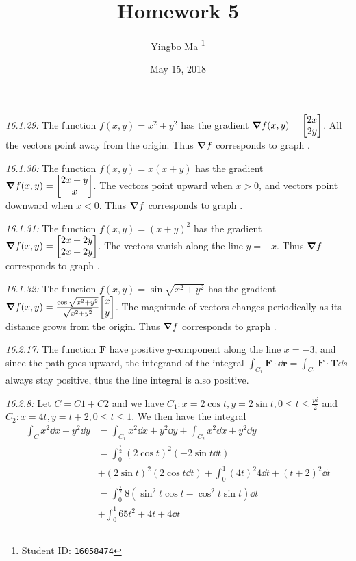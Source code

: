 \documentclass[8pt,twocolumn]{article}
\author{Yingbo Ma \thanks{Student ID: \tt{16058474}}}
\title{\vspace{-1.cm}Homework 5}
\date{May 15, 2018}
\begin{document}
\maketitle

\begin{Answer}[number=29]
  \emph{16.1.29:}
  The function $f(x,y) = x^2 + y^2$ has the gradient $\grad f(x,y) =
  \mqty[2x\\2y]$. All the vectors point away from the origin.
  Thus $\grad f$ corresponds to graph .

  \emph{16.1.30:}
  The function $f(x,y) = x(x+y)$ has the gradient $\grad f(x,y) =
  \mqty[2x+y\\x]$. The vectors point upward when $x>0$, and vectors point
  downward when $x<0$.
  Thus $\grad f$ corresponds to graph .

  \emph{16.1.31:}
  The function $f(x,y) = (x+y)^2$ has the gradient $\grad f(x,y) =
  \mqty[2x+2y\\2x+2y]$. The vectors vanish along the line $y=-x$.
  Thus $\grad f$ corresponds to graph .

  \emph{16.1.32:}
  The function $f(x,y) = \sin \sqrt{x^2+y^2}$ has the gradient $\grad f(x,y) =
  \frac{\cos\sqrt{x^2+y^2}}{\sqrt{x^2+y^2}}\mqty[x\\y]$. The magnitude of
  vectors changes periodically as its distance grows from the origin.
  Thus $\grad f$ corresponds to graph .

  \emph{16.2.17:}
  The function $\bm{F}$ have positive $y$-component along the line $x=-3$, and
  since the path goes upward, the integrand of the integral
  $\int_{C_1}\bm{F}\cdot \dd{\bm{r}} = \int_{C_1}\bm{F}\cdot\bm{T} \dd{s}$ always
  stay positive, thus the line integral is also positive.

  \emph{16.2.8:}
  Let $C = C1 + C2$ and we have $C_1: x=2\cos t, y=2\sin t, 0\le t \le
  \frac{pi}{2}$ and $C_2: x=4t, y=t+2, 0\le t\le 1$. We then have the integral
  \begin{align*}
    \int_C x^2\dd{x}+y^2\dd{y} &= \int_{C_1} x^2\dd{x}+y^2\dd{y} + \int_{C_2}
    x^2\dd{x}+y^2\dd{y} \\
    &= \int_0^{\frac{\pi}{2}}(2\cos t)^2 (-2\sin t\dd{t}) \\
    &+ (2\sin t)^2 (2\cos t\dd{t}) + \int_0^1 (4t)^2 4\dd{t} + (t+2)^2 \dd{t}
    \\
    &= \int_0^{\frac{\pi}{2}}8 (\sin^2 t \cos t - \cos^2 t\sin t)\dd{t} \\
    &+\int_0^1 65t^2+4t+4 \dd{t}
  \end{align*}
\end{Answer}
\end{document}
